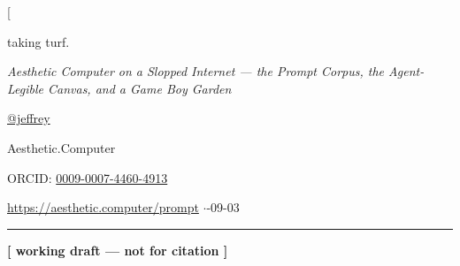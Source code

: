 \documentclass[10pt,letterpaper,twocolumn]{article}
\begin{document}
\twocolumn[{%
\begin{center}
{\acbold\fontsize{26pt}{30pt}\selectfont\color{acdark} taking {\color{acgreen}turf}{\color{acpink}.}}\par
\vspace{0.5em}
{\normalfont\small\itshape\color{acpink} Aesthetic Computer on a Slopped Internet --- the Prompt Corpus, the Agent-Legible Canvas, and a Game Boy Garden}\par
\vspace{0.6em}
{\normalsize\href{https://prompt.ac/@jeffrey}{@jeffrey}}\par
{\small\color{acgray} Aesthetic.Computer}\par
{\small\color{acgray} ORCID: \href{https://orcid.org/0009-0007-4460-4913}{0009-0007-4460-4913}}\par
\vspace{0.3em}
{\small\color{acpurple} \url{https://aesthetic.computer/prompt} \enspace$\cdot$-09-03}\par
\vspace{0.6em}
\rule{\textwidth}{1.5pt}
\vspace{0.5em}
\end{center}

\begin{center}
{\small\color{draftcolor}\textbf{[ working draft --- not for citation ]}}
\end{center}
\vspace{0.3em}

}
\end{document}
